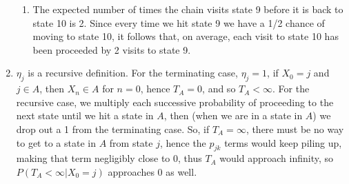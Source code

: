 \documentclass{article}
\begin{document}
\begin{enumerate}
\begin{enumerate}
			\item The expected number of times the chain visits state 9 before it is back to state 10 is 2. Since every time we hit state 9 we have a 1/2 chance of moving to state 10, it follows that, on average, each visit to state 10 has been proceeded by 2 visits to state 9.
		\end{enumerate}
	\item %
		$\eta_j$ is a recursive definition. For the terminating case, $\eta_j = 1$, if $X_0 = j$ and $j \in A$, then $X_n \in A$ for $n = 0$, hence $T_A = 0$, and so $T_A < \infty$. For the recursive case, we multiply each successive probability of proceeding to the next state until we hit a state in $A$, then (when we are in a state in $A$) we drop out a 1 from the terminating case. So, if $T_A = \infty$, there must be no way to get to a state in $A$ from state $j$, hence the $p_{jk}$ terms would keep piling up, making that term negligibly close to 0, thus $T_A$ would approach infinity, so $P(T_A < \infty | X_0 = j)$ approaches 0 as well.
\end{enumerate}
\end{document}
